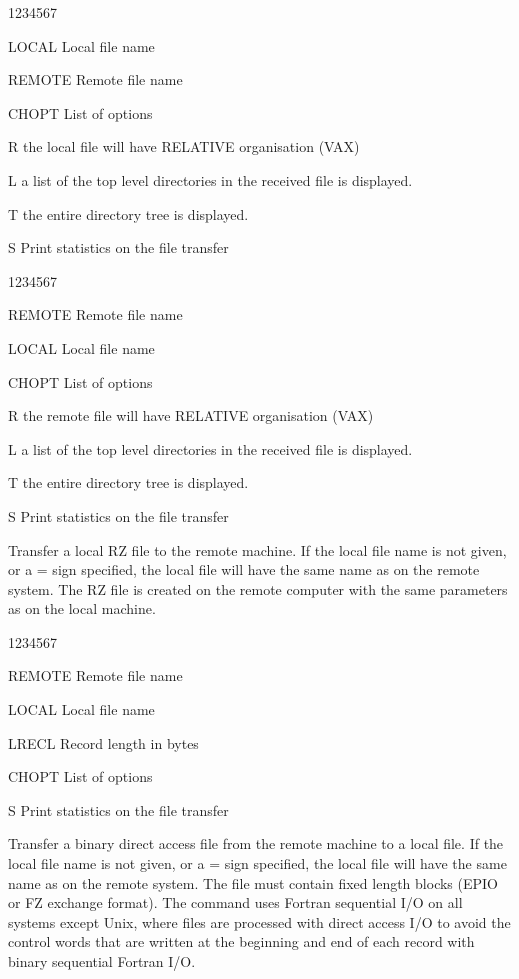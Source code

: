 \begin{DLtt}{1234567}
\item[LOCAL]Local file name
\item[REMOTE]Remote file name
\item[CHOPT]List of options
\begin{DLtt}{12}
\item[R]the local file will have RELATIVE organisation (VAX)
\item[L]a list of the top level directories in the received file
is displayed.
\item[T]the entire directory tree is displayed.
\item[S]Print statistics on the file transfer
\end{DLtt}
\end{DLtt}

\begin{DLtt}{1234567}
\item[REMOTE]Remote file name
\item[LOCAL]Local file name
\item[CHOPT]List of options
\begin{DLtt}{12}
\item[R]the remote file will have RELATIVE organisation (VAX)
\item[L]a list of the top level directories in the received file
is displayed.
\item[T]the entire directory tree is displayed.
\item[S]Print statistics on the file transfer
\end{DLtt}
\end{DLtt}
Transfer a local RZ file to the remote machine.
If the local file name is not given, or a = sign specified,
the local file will have the same name as on the remote system.
The RZ file is created on the remote computer with the same
parameters as on the local machine.

\begin{DLtt}{1234567}
\item[REMOTE]Remote file name
\item[LOCAL]Local file name
\item[LRECL]Record length in bytes
\item[CHOPT]List of options
\begin{DLtt}{12}
\item[S]Print statistics on the file transfer
\end{DLtt}
\end{DLtt}
Transfer a binary direct access
file from the remote machine to a local file.
If the local file name is not given, or a = sign specified,
the local file will have the same name as on the remote system.
The file must contain
fixed length blocks (EPIO or FZ exchange format).
The  command uses Fortran
sequential I/O on all systems except Unix, where files are
processed with direct access I/O to avoid the control
words that are written at the beginning and end of each
record with binary sequential Fortran I/O.

